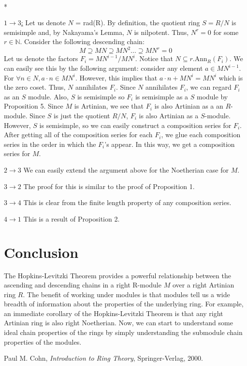 \documentclass[11pt]{article}
\newenvironment{myproof}[1][\proofname]{\proof[#1]\mbox{}\\*}{\endproof}
\begin{document}
\noindent
\begin{myproof}

\underline{$1 \rightarrow 3$:} Let us denote $N$ = rad(R). By definition, the quotient ring $S=R/N$ is semisimple and, by Nakayama's Lemma,
$N$ is nilpotent. Thus, $N^r=0$ for some $r \in \mathbb{N}$. Consider the following descending chain:
\begin{equation}
 M \supseteq MN \supseteq MN^2 ... \supseteq MN^r = 0
\end{equation}
Let us denote the factors $F_i = MN^{i-1}/MN^{i}$. Notice that $N \subseteq r.\text{Ann}_{R}(F_i)$. We can easily see this by the following argument: consider any element $a \in MN^{i-1}$. For $\forall n \in N, a\cdot n \in MN^{i}$. However, this implies that
$a \cdot n + MN^{i} = MN^{i}$ which is the zero coset. Thus, $N$ annihilates $F_i$.  Since $N$ annihilates $F_i$, we can regard $F_i$ as an $S$ module. Also, $S$ is semisimple so $F_i$ is semisimple as a $S$ module by Proposition 5. Since $M$ is Artinian, we see that $F_i$ is also Artinian as a an $R$-module. 
Since $S$ is just the quotient $R/N$, $F_i$ is also Artinian as a $S$-module. However, $S$ is semisimple, so we can easily construct a composition series for $F_i$. After getting all of the composition series for each $F_i$, we glue each composition series in the order in which the $F_i$'s appear. In this way, we get a composition series for $M$. \newline

\underline{$2 \rightarrow 3$} We can easily extend the argument above for the Noetherian case for $M$. \newline

\underline{$3 \rightarrow 2$} The proof for this is similar to the proof of Proposition 1.\newline

\underline{$3 \rightarrow 4$} This is clear from the finite length property of any composition series.\newline

\underline{$4 \rightarrow 1$} This is a result of Proposition 2. \end{myproof}

\section{Conclusion}

The Hopkins-Levitzki Theorem provides a powerful relationship between the ascending and descending chains in a right R-module $M$ over a right Artinian ring $R$. The benefit of working under modules is that modules tell us a wide breadth of information about the properties of the underlying ring. For example, an immediate corollary of the Hopkins-Levitzki Theorem is that any
right Artinian ring is also right Noetherian. Now, we can start to understand some ideal chain properties of the rings by simply understanding the submodule chain properties of the modules. 

\newpage
\begin{thebibliography}{9}
    Paul M. Cohn,
    \textit{Introduction to Ring Theory},
    Springer-Verlag, 2000.
\end{thebibliography}
\end{document}
